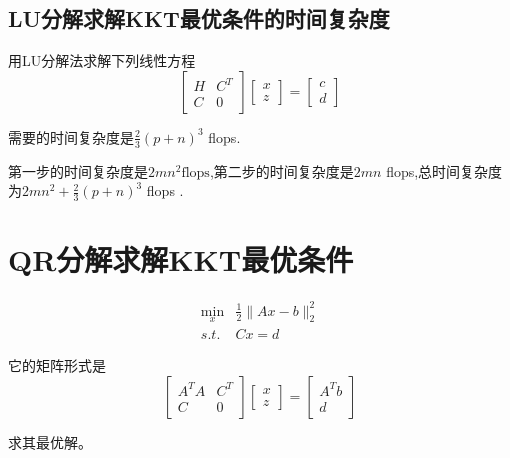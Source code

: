 \subsection{LU分解求解KKT最优条件的时间复杂度}

\begin{theorem}
    用LU分解法求解下列线性方程 
\begin{equation}
\left[\begin{array}{cc}
H & C^{T} \\
C & 0
\end{array}\right]\left[\begin{array}{l}
x \\
z
\end{array}\right]=\left[\begin{array}{l}
c \\
d
\end{array}\right]
\end{equation}

需要的时间复杂度是$ \frac{2}{3}(p+n)^{3} $ flops.
\end{theorem}

第一步的时间复杂度是$2 m n^{2}  \text{flops} $,第二步的时间复杂度是$2 {mn} $ flops,总时间复杂度为$ 2 m n^{2}+\frac{2}{3}(p+n)^{3} $ flops .

\section{QR分解求解KKT最优条件}

\begin{problem}
    \begin{equation}\begin{aligned}
        \min _{x} & \frac{1}{2}\|A x-b\|_{2}^{2}\\
        s.t. & C x=d
    \end{aligned}\end{equation}

    它的矩阵形式是
    \begin{equation}
\left[\begin{array}{cc}
A^{T} A & C^{T} \\
C & 0
\end{array}\right]\left[\begin{array}{l}
x \\
z
\end{array}\right]=\left[\begin{array}{c}
A^{T} b \\
d
\end{array}\right]
\end{equation}

求其最优解。
\end{problem}


